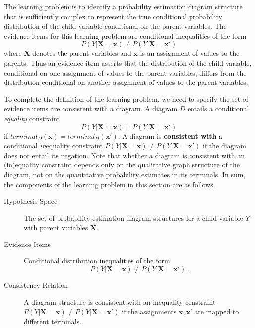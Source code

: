 \documentclass{elsarticle}%
\newcommand{\X}{X}
\newcommand{\Y}{Y}
\newcommand{\Z}{Z}
\newcommand{\tree}{D}
\newcommand{\leaf}{\mathit{terminal}}
\newcommand{\parentval}{x}
\newcommand{\parentvals}{\mathbf{\parentval}}
\newcommand{\childvar}{\Y}
\newcommand{\parentvar}{\X}
\newcommand{\parentvars}{\mathbf{\parentvar}}
\newcommand{\partialparents}{\mathbf{\Z}}
\newcommand{\partialparentvals}{\mathbf{z}}
\begin{document}
The learning problem is to identify a probability estimation diagram structure that is sufficiently complex to represent the true conditional probability distribution of the child variable conditional on the parent variables. The evidence items for this learning problem are conditional inequalities of the form 
$$P(\childvar|\parentvars = \parentvals) \neq P(\childvar|\parentvars = \parentvals')$$
where $\parentvars$ denotes the parent variables and $\parentvals$ is an assignment of values to the parents. 
Thus an evidence item asserts that the distribution of the child variable, conditional on one assignment of values to the parent variables, differs from the distribution conditional on another assignment of values to the parent variables.  


%


To complete the definition of the learning problem, we need to specify the set of evidence items are consistent with a diagram. 
A diagram $\tree$ entails a conditional {\em equality} constraint 
$$P(\childvar|\parentvars = \parentvals) = P(\childvar|\parentvars = \parentvals')$$ if $\leaf_{\tree}(\parentvals) = \leaf_{\tree}(\parentvals')$. A diagram is \textbf{consistent with}
a conditional {\em in}equality constraint $P(\childvar|\parentvars = \parentvals) \neq P(\childvar|\parentvars = \parentvals')$  if the diagram does not entail its negation. Note that whether a diagram is consistent with an (in)equality constraint depends only on the qualitative graph structure of the diagram, not on the quantitative probability estimates in its terminals. In sum, the components of the learning problem in this section are as follows.

\begin{description}
\item[Hypothesis Space] The set of probability estimation diagram structures for a child variable $\childvar$ with parent variables $\parentvars$.
\item[Evidence Items] Conditional distribution inequalities of the form $$P(\childvar|\parentvars = \parentvals) \neq P(\childvar|\parentvars = \parentvals').$$
\item[Consistency Relation] A diagram structure is consistent with an inequality constraint $P(\childvar|\parentvars = \parentvals) \neq P(\childvar|\parentvars = \parentvals')$ if the assignments $\parentvals,\parentvals'$ are mapped to different terminals.
\end{description}
\end{document}

